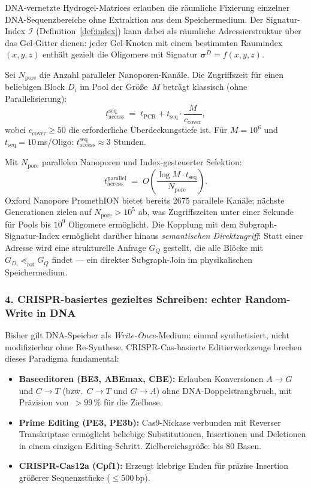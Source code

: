 ﻿\documentclass[a4paper,12pt]{article}
\theoremstyle{definition}
\begin{document}
DNA-vernetzte Hydrogel-Matrices erlauben die r\"{a}umliche Fixierung einzelner
DNA-Sequenz\-bereiche ohne Extraktion aus dem Speichermedium.
Der Signatur-Index $\mathcal{I}$ (Definition~\ref{def:index}) kann dabei
als r\"{a}umliche Adressierstruktur \"{u}ber das Gel-Gitter dienen:
jeder Gel-Knoten mit einem bestimmten Raumindex $(x,y,z)$ enth\"{a}lt
gezielt die Oligomere mit Signatur $\boldsymbol{\sigma}^D = f(x,y,z)$.

Sei $N_{\mathrm{pore}}$ die Anzahl paralleler Nanoporen-Kan\"{a}le.
Die Zugriffszeit f\"{u}r einen beliebigen Block $D_i$ im Pool der Gr\"{o}\ss{}e~$M$
betr\"{a}gt klassisch (ohne Parallelisierung):
\[
    t_{\mathrm{access}}^{\mathrm{seq}} \;=\;
    t_{\mathrm{PCR}} + t_{\mathrm{seq}} \cdot \frac{M}{c_{\mathrm{cover}}},
\]
wobei $c_{\mathrm{cover}} \ge 50$ die erforderliche \"{U}berdeckungstiefe ist.
F\"{u}r $M = 10^6$ und $t_{\mathrm{seq}} = 10$\,ms/Oligo:
$t_{\mathrm{access}}^{\mathrm{seq}} \approx 3$ Stunden.

Mit $N_{\mathrm{pore}}$ parallelen Nanoporen und Index-gesteuerter Selektion:
\[
    t_{\mathrm{access}}^{\mathrm{parallel}} \;=\;
    O\!\left(\frac{\log M \cdot t_{\mathrm{seq}}}{N_{\mathrm{pore}}}\right).
\]
Oxford Nanopore PromethION bietet bereits 2675 parallele Kan\"{a}le;
n\"{a}chste Generationen zielen auf $N_{\mathrm{pore}} > 10^5$ ab,
was Zugriffszeiten unter einer Sekunde f\"{u}r Pools bis $10^9$ Oligomere
erm\"{o}glicht.
Die Kopplung mit dem Subgraph-Signatur-Index erm\"{o}glicht dar\"{u}ber hinaus
\emph{semantischen Direktzugriff}: Statt einer Adresse wird eine strukturelle
Anfrage $G_Q$ gestellt, die alle Bl\"{o}cke mit
$G_{D_i} \preceq_{\mathrm{rot}} G_Q$ findet ---
ein direkter Subgraph-Join im physikalischen Speichermedium.

\subsubsection*{4.\; CRISPR-basiertes gezieltes Schreiben: echter Random-Write in DNA}

Bisher gilt DNA-Speicher als \emph{Write-Once}-Medium: einmal synthetisiert,
nicht modifizierbar ohne Re-Synthese. CRISPR-Cas-basierte Editierwerkzeuge
brechen dieses Paradigma fundamental:
\begin{itemize}
    \item \textbf{Baseeditoren (BE3, ABEmax, CBE):} Erlauben Konversionen
          $A \to G$ und $C \to T$ (bzw.\ $C \to T$ und $G \to A$) ohne
          DNA-Doppelstrangbruch, mit Pr\"{a}zision von~$> 99\,\%$ f\"{u}r
          die Zielbase.
    \item \textbf{Prime Editing (PE3, PE3b):} Cas9-Nickase verbunden mit
          Reverser Transkriptase erm\"{o}glicht beliebige Substitutionen,
          Insertionen und Deletionen in einem einzigen Editing-Schritt.
          Zielbereichsgr\"{o}\ss{}e: bis 80 Basen.
    \item \textbf{CRISPR-Cas12a (Cpf1):} Erzeugt klebrige Enden f\"{u}r
          pr\"{a}zise Insertion gr\"{o}\ss{}erer Sequenzst\"{u}cke
          ($\le 500$\,bp).
\end{itemize}
\end{document}
